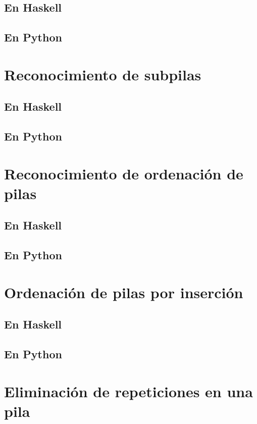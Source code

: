 \documentclass[a4paper,12pt,twoside]{book}
\begin{document}
\subsection{En Haskell}
\subsection{En Python}

\section{Reconocimiento de subpilas}
\subsection{En Haskell}
\subsection{En Python}

\section{Reconocimiento de ordenación de pilas}
\subsection{En Haskell}
\subsection{En Python}

\section{Ordenación de pilas por inserción}
\subsection{En Haskell}
\subsection{En Python}

\section{Eliminación de repeticiones en una pila}
\end{document}
